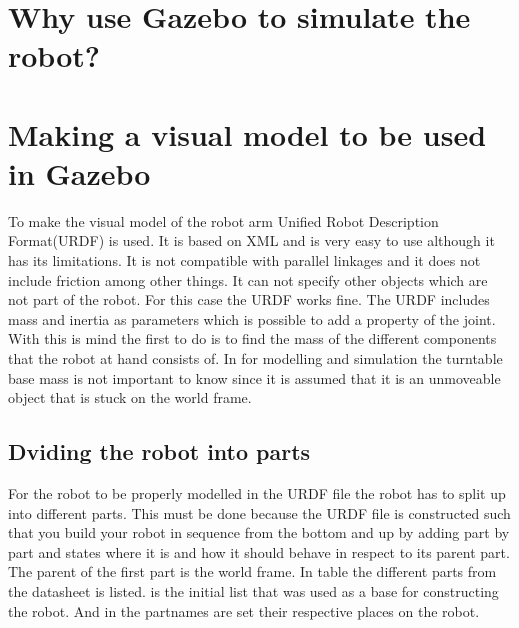 \section*{Why use Gazebo to simulate the robot?}

\section*{Making a visual model to be used in Gazebo}
To make the visual model of the robot arm Unified Robot Description Format(URDF) is used. It is based on XML and is very easy to use although it has its limitations. It is not compatible with parallel linkages and it does not include friction among other things. It can not specify other objects which are not part of the robot. For this case the URDF works fine. The URDF includes mass and inertia as parameters which is possible to add a property of the joint. With this is mind the first to do is to find the mass of the different components that the robot at hand consists of. In  for modelling and simulation the turntable base mass is not important to know since it is assumed that it is an unmoveable object that is stuck on the world frame. \\

\subsection*{Dviding the robot into parts}
For the robot to be properly modelled in the URDF file the robot has to split up into different parts. This must be done because the URDF file is constructed such that you build your robot in sequence from the bottom and up by adding part by part and states where it is and how it should behave in respect to its parent part. The parent of the first part is the world frame. In table  the different parts from the datasheet is listed.  is the initial list that was used as a base for constructing the robot. And in  the partnames are set their respective places on the robot. 

